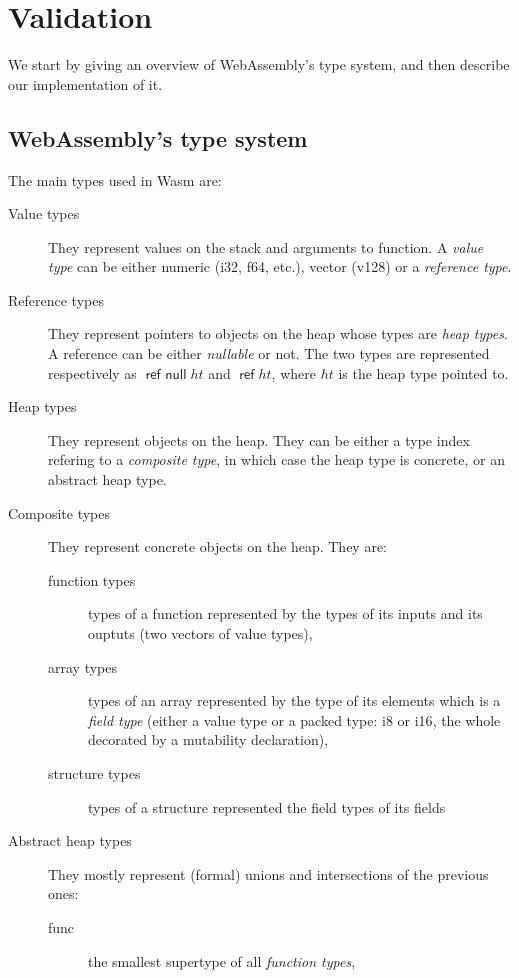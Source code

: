 \documentclass[10pt]{article}
\DeclareMathOperator{\reft}{\textsf{ref}}
\DeclareMathOperator{\refnullt}{\textsf{ref null}}
\begin{document}
\section{Validation}\label{val}
We start by giving an overview of WebAssembly's type system, and then describe
our implementation of it.
\subsection{WebAssembly's type system}
The main types used in Wasm are:
\begin{description}
  \item[Value types] They represent values on the stack and arguments to
    function. A \emph{value type} can be either numeric (\textsf{i32},
    \textsf{f64}, etc.), vector (\textsf{v128}) or a \emph{reference type}.
  \item[Reference types] They represent pointers to objects on the heap whose
    types are \emph{heap types}. A reference can be either \emph{nullable} or
    not. The two types are represented respectively as $\refnullt ht$ and $\reft
    ht$, where $ht$ is the heap type pointed to.
  \item[Heap types] They represent objects on the heap. They can be either a
    type index refering to a \emph{composite type}, in which case the heap type
    is concrete, or an abstract heap type.
  \item[Composite types] They represent concrete objects on the heap. They are:
    \begin{description}
      \item[function types] types of a function represented by the types of its
        inputs and its ouptuts (two vectors of value types),
      \item[array types] types of an array represented by the type of its
        elements which is a \emph{field type} (either a value type or a packed
        type: \textsf{i8} or \textsf{i16}, the whole decorated by a mutability
        declaration),
      \item[structure types] types of a structure represented the field types of
        its fields
    \end{description}
  \item[Abstract heap types] They mostly represent (formal) unions and
    intersections of the previous ones:
    \begin{description}
      \item[\textsf{func}] the smallest supertype of all \emph{function types},

\end{description}
\end{description}
\end{document}
